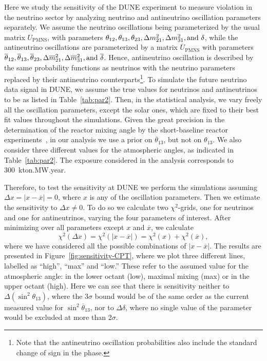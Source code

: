Here we study the sensitivity of the DUNE experiment to measure  violation in the neutrino sector by analyzing neutrino and antineutrino oscillation parameters separately. We assume the neutrino oscillations being parameterized by the usual  matrix $U_{\text{PMNS}}$, with parameters $\theta_{12},\theta_{13},\theta_{23},\Delta m_{21}^2,\Delta m_{31}^2, {\rm and}~\delta$, while the antineutrino oscillations are parameterized by a matrix $\overline{U}_{\text{PMNS}}$ with parameters $\overline{\theta}_{12},\overline{\theta}_{13},\overline{\theta}_{23},\Delta \overline{m}_{21}^2,\Delta \overline{m}_{31}^2, {\rm and}~\overline{\delta}$. Hence, antineutrino oscillation is described  by the same probability functions as neutrinos with the neutrino parameters replaced by their antineutrino counterparts\footnote{Note that the antineutrino oscillation probabilities also include the standard change of sign in the  phase.}. 
To simulate the future neutrino data signal in DUNE, we assume the true values for neutrinos and antineutrinos to be as listed in Table~\ref{tab:par2}.
Then, in the statistical analysis, we vary freely all the oscillation parameters, except the solar ones, which are fixed to their best fit values throughout the simulations. Given the great precision in the determination of the reactor mixing angle by the short-baseline reactor experiments~\cite{An:2016ses,RENO:2015ksa,Abe:2014bwa}, in our analysis we use a prior on $\overline{\theta}_{13}$, but not on $\theta_{13}$. We also consider three different values for the atmospheric angles, as indicated in Table~\ref{tab:par2}. The exposure considered in the analysis corresponds to 300~kton.MW.year.

Therefore, to test the sensitivity at DUNE we perform the simulations assuming $\Delta x = |x-\overline{x}| = 0$, where $x$ is any of the oscillation parameters. Then we estimate the sensitivity to $\Delta x\neq 0$. To do so we calculate two $\chi^2$-grids, one for neutrinos and one for antineutrinos, varying the four parameters of interest. After minimizing over all parameters except $x$ and $\overline{x}$, we calculate 
%
\begin{equation}
 \chi^2(\Delta x) = \chi^2(|x-\overline{x}|) = \chi^2(x)+\chi^2(\overline{x}),
 \label{eq:chi2-nu-nubar}
\end{equation}
%
where we have considered all the possible combinations of $|x-\overline{x}|$. The results are presented in Figure~\ref{fig:sensitivity-CPT}, where we plot three different lines, labelled as ``high'', ``max'' and ``low.'' These refer to the assumed value for the atmospheric angle: in the lower octant (low), maximal mixing (max) or in the upper octant (high). Here we can see that there is sensitivity neither to $\Delta(\sin^2\theta_{13})$, where the 3$\sigma$ bound would be of the same order %
as the current measured value for $\sin^2\overline{\theta}_{13}$, nor to $\Delta\delta$, where no single value of the parameter would be excluded at more than 2$\sigma$.

